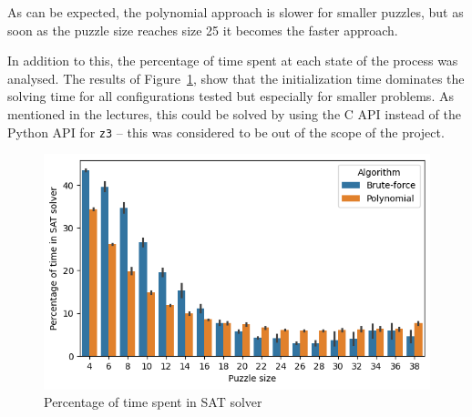\documentclass[12pt]{article}
\begin{document}
As can be expected, the polynomial approach is slower for smaller puzzles, but as soon as the puzzle size reaches size 25 it becomes the faster approach.

In addition to this, the percentage of time spent at each state of the process was analysed.
The results of Figure~\ref{fig:util}, show that the initialization time dominates the solving time for all configurations tested but especially for smaller problems.
As mentioned in the lectures, this could be solved by using the C API instead of the Python API for \texttt{z3} -- this was considered to be out of the scope of the project.

\begin{figure}[H]
  \includegraphics[scale=0.5]{util.png}
  \centering
  \caption{Percentage of time spent in SAT solver}
  \label{fig:util}
\end{figure}
\end{document}

